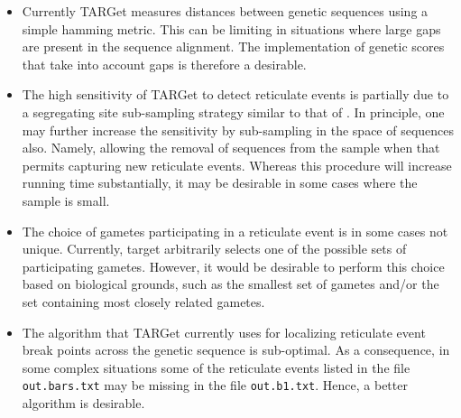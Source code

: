 \documentclass[12pt]{article}
\begin{document}
\begin{itemize}
\item Currently TARGet measures distances between genetic sequences using a simple hamming metric. This can be limiting in situations where large gaps are present in the sequence alignment. The implementation of genetic scores that take into account gaps is therefore a desirable.

\item The high sensitivity of TARGet to detect reticulate events is partially due to a segregating site sub-sampling strategy similar to that of \cite{mg}. In principle, one may further increase the sensitivity by sub-sampling in the space of sequences also. Namely, allowing the removal of sequences from the sample when that permits capturing new reticulate events. Whereas this procedure will increase running time substantially, it may be desirable in some cases where the sample is small.

\item The choice of gametes participating in a reticulate event is in some cases not unique. Currently, target arbitrarily selects one of the possible sets of participating gametes. However, it would be desirable to perform this choice based on biological grounds, such as the smallest set of gametes and/or the set containing most closely related gametes.

\item The algorithm that TARGet currently uses for localizing reticulate event break points across the genetic sequence is sub-optimal. As a consequence, in some complex situations some of the reticulate events listed in the file \texttt{out.bars.txt} may be missing in the file \texttt{out.b1.txt}. Hence, a better algorithm is desirable.
\end{itemize}
\end{document}
